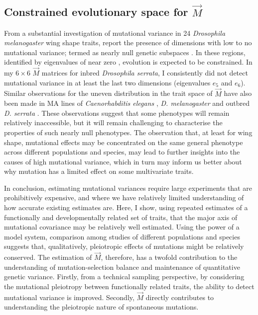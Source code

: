 \subsection{Constrained evolutionary space for $\vec{M}$}
From a substantial investigation of mutational variance in 24 \textit{Drosophila melanogaster} wing shape traits, \citet{Houl13} report the presence of dimensions with low to no mutational variance; termed as nearly null genetic subspaces \citep{Gomu09,Houl13,Hine14}. In these regions, identified by eigenvalues of near zero \citep{Meze05}, evolution is expected to be constrained. In my $6\times6$ $\vec{M}$ matrices for inbred \textit{Drosophila serrata}, I consistently did not detect mutational variance in at least the last two dimensions (eigenvalues $e_5$ and $e_6$). Similar observations for the uneven distribution in the trait space of $\vec{M}$ have also been made in MA lines of \textit{Caenorhabditis elegans} \citep{Keig00,Este05,Mall23}, \textit{D. melanogaster} and outbred \textit{D. serrata} \citep{Duga21}. These observations suggest that some phenotypes will remain relatively inaccessible, but it will remain challenging to characterise the properties of such nearly null phenotypes. The observation that, at least for wing shape, mutational effects may be concentrated on the same general phenotype across different populations and species, may lead to further insights into the causes of high mutational variance, which in turn may inform us better about why mutation has a limited effect on some multivariate traits.\par

In conclusion, estimating mutational variances require large experiments that are prohibitively expensive, and where we have relatively limited understanding of how accurate existing estimates are. Here, I show, using repeated estimates of a functionally and developmentally related set of traits, that the major axis of mutational covariance may be relatively well estimated. Using the power of a model system, comparison among studies of different populations and species suggests that, qualitatively, pleiotropic effects of mutations might be relatively conserved. The estimation of $\vec{M}$, therefore, has a twofold contribution to the understanding of mutation-selection balance and maintenance of quantitative genetic variance. Firstly, from a technical sampling perspective, by considering the mutational pleiotropy between functionally related traits, the ability to detect mutational variance is improved. Secondly, $\vec{M}$ directly contributes to understanding the pleiotropic nature of spontaneous mutations. \par




